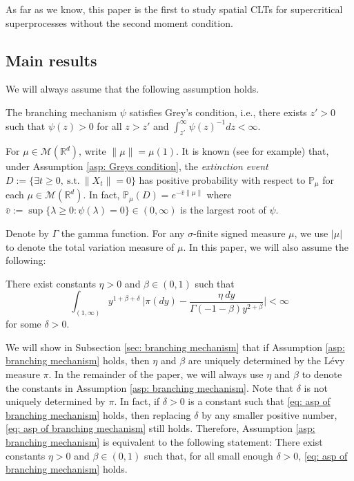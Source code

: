 \documentclass[EJP]{ejpecp} %
\begin{document}
	As far as we know, this paper is the first to study spatial CLTs for supercritical superprocesses without the second moment condition.

\subsection{Main results}
\label{sec:I:R}
	We will always assume that the following assumption holds.

\begin{assumption}
\label{asp: Greys condition}
	The branching mechanism $\psi$ satisfies Grey's condition, i.e., there exists $z' > 0$ such that $\psi(z) > 0$ for all $z>z'$ and  $\int_{z'}^\infty \psi(z)^{-1}dz < \infty$.
\end{assumption}

	For $\mu \in \mathcal M(\mathbb R^d)$, write $\|\mu\| = \mu(1)$.
	It is known (see \cite[Theorems 12.5 \& 12.7]{Kyprianou2014Fluctuations} for example) that, under Assumption \ref{asp: Greys condition}, the \emph{extinction event} $D :=\{\exists t\geq 0,~\text{s.t.}~ \|X_t\| =0 \}$ has positive probability with respect to $\mathbb P_\mu$ for each  $\mu \in \mathcal M(\mathbb R^d)$.
	In fact, $ \mathbb{P}_{\mu} (D) = e^{-\bar v \|\mu\|}$ where $ \bar v := \sup\{\lambda \geq 0: \psi(\lambda) = 0\} \in (0,\infty) $ is the largest root of $\psi$.

	Denote by $\Gamma$ the gamma function.
	For any $\sigma$-finite signed measure $\mu$, we use $|\mu|$ to denote the total variation measure of $\mu$.
	In this paper, we will also assume the following:

\begin{assumption}
\label{asp: branching mechanism}
	There exist constants $\eta > 0$ and $\beta \in (0,1)$ such that
\begin{equation}
\label{eq: asp of branching mechanism}
    \int_{(1,\infty)}y^{1+\beta +\delta}~\Big|\pi(dy)-\frac{\eta~dy}{\Gamma(-1-\beta)y^{2+\beta}}\Big| <\infty
\end{equation}
	for some $\delta > 0$.
\end{assumption}

	We will show in Subsection \ref{sec: branching mechanism} that if Assumption \ref{asp: branching mechanism} holds, then $\eta$ and $\beta$ are uniquely determined by the L\'evy measure $\pi$.
   	In the remainder of the paper, we will always use $\eta$ and $\beta$ to denote the constants in Assumption  \ref{asp: branching mechanism}.
	Note that $\delta$ is not uniquely determined by $\pi$.
	In fact, if $\delta>0$ is a constant such that \eqref{eq: asp of branching mechanism} holds, then replacing $\delta$ by any smaller positive number, \eqref{eq: asp of branching mechanism} still holds.
	Therefore, Assumption \ref{asp: branching mechanism} is equivalent to the following statement:
	There exist constants $\eta > 0$ and $\beta \in (0,1)$ such that, for all small enough $\delta>0$, \eqref{eq: asp of branching mechanism} holds.
\end{document}
